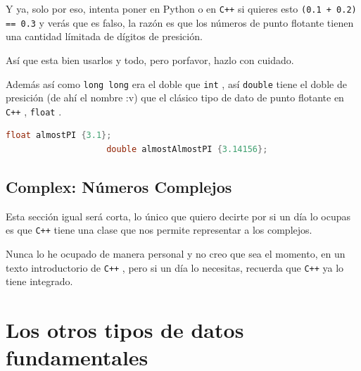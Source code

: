 \documentclass[12pt, fleqn]{report}                             %
\theoremstyle{break}                                            %
\newcommand{\textCode}[1]  { \texttt{#1} }                      %
\newcommand{\Cpp}{\ignorespaces\textCode{C++}}                  %
\begin{document}
                Y ya, solo por eso, intenta poner en Python o en \Cpp si quieres esto 
                \textCode{(0.1 + 0.2) == 0.3} y verás que es falso, la razón es que los números de punto
                flotante tienen una cantidad límitada de dígitos de presición.

                Así que esta bien usarlos y todo, pero porfavor, hazlo con cuidado.

                Además así como \textCode{long long} era el doble que \textCode{int}, así
                \textCode{double} tiene el doble de presición (de ahí el nombre :v) que el clásico
                tipo de dato de punto flotante en \Cpp, \textCode{float}.

                \begin{lstlisting}[language=C++, gobble=20]
                    float almostPI {3.1};
                    double almostAlmostPI {3.14156};
                \end{lstlisting}
                

            \subsection{Complex: Números Complejos}

                Esta sección igual será corta, lo único que quiero decirte por si un día lo ocupas
                es que \Cpp tiene una clase que nos permite representar a los complejos.

                Nunca lo he ocupado de manera personal y no creo que sea el momento, en un texto introductorio
                de \Cpp, pero si un día lo necesitas, recuerda que \Cpp ya lo tiene integrado.

            
        \clearpage
        \section{Los otros tipos de datos fundamentales}

\end{document}
